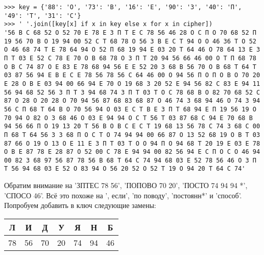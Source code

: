\documentclass[letterpaper,11pt,openany]{book}
\begin{document}
\medskip

\begin{lstlisting}
>>> key = {'88': 'О', '73': 'В', '16': 'Е', '90': 'З', '40': 'П', '49': 'Т', '31': 'С'}
>>> ' '.join([key[x] if x in key else x for x in cipher])
'56 В С 68 52 О 52 70 Е 78 Е З П Т Е С 78 56 46 28 О С П О 70 68 52 П 19 56 70 В О 19 94 00 52 С Т 68 78 О 56 З В Е С Т 94 О О 46 36 Т О 52 О 46 68 74 Т Е 78 64 94 О 52 П 68 19 94 Е 03 20 Т 64 46 О 78 64 13 Е З П Т 03 Е 52 С 78 Е 70 О В 68 78 О З П Т 20 94 56 66 46 00 О Т П 68 78 О В С 74 87 О Е 83 Е 78 68 94 56 Е Е 52 20 З 68 В 56 70 О В 68 Т 64 Т 03 87 56 94 Е В Е С Е 78 56 78 56 С 64 46 00 О 94 56 П О П О В О 70 20 Е 28 О В Е 03 94 00 66 94 Е 70 О 19 68 З 20 52 Е 94 56 82 С 83 Е 94 11 56 94 68 52 56 З П Т З 94 68 74 З П Т 03 Т О С 78 68 В О 82 70 68 52 С 87 О 28 О 20 28 О 70 94 56 87 68 83 68 87 О 46 74 З 68 94 46 О 74 З 94 56 С П 68 Т 64 В О 70 56 94 О 03 Е С Т В Е З П Т 68 94 Е П 19 56 19 О 70 94 О 82 О З 68 46 О 03 Е 94 94 О С Т 56 Т 03 87 68 С 94 Е 70 68 В 94 56 66 П О 19 13 20 Т 56 В О В С Е С Т 19 68 13 56 78 С 74 З 68 С 00 П 68 Т 64 56 З З 68 П О С Т О 74 94 94 00 66 87 О 13 52 68 19 О В Т 03 87 66 О 19 О 13 О Е 11 Е З П Т 03 Т О О 94 П О 94 68 Т 20 19 Е 03 Е 78 О В Е 87 78 Е 28 87 О 52 00 С 78 Е 94 94 00 82 56 94 Е С П О С О 46 94 00 82 З 68 97 56 87 78 56 В 68 Т 64 С 74 94 68 03 Е 52 78 56 46 О З П Т 56 94 68 03 Е 52 О 83 94 О 56 20 52 О 52 Т 19 О 94 20 Т 64 С 74'
\end{lstlisting}

Обратим внимание на 'ЗПТЕС 78 56', 'ПОПОВО 70 20', 'ПОСТО 74 94 94 *', 'СПОСО 46'. Всё это похоже на ', если', 'по поводу', 'постоянн*' и 'способ'. Попробуем добавить в ключ следующие замены:

\medskip

{\centering
\begin{tabular}{||c|c|c|c|c|c|c||}
\hline
\textbf{Л} & \textbf{И} & \textbf{Д} & \textbf{У} & \textbf{Я} & \textbf{Н} & \textbf{Б} \\
\hline
78 & 56 & 70 & 20 & 74 & 94 & 46  \\
\hline
\end{tabular}

}

\medskip
\end{document}
